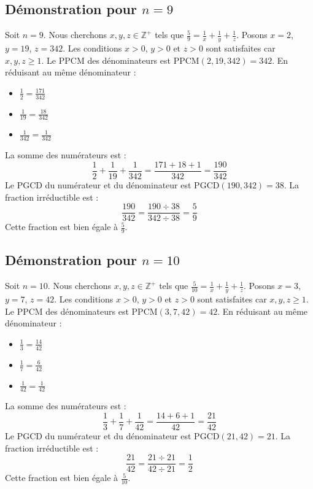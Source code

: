 \documentclass[11pt,a4paper]{article}
\begin{document}
\subsection{Démonstration pour $n = 9$}
Soit $n = 9$. Nous cherchons $x, y, z \in \mathbb{Z}^{+}$ tels que $\frac{5}{9} = \frac{1}{x} + \frac{1}{y} + \frac{1}{z}$.
Posons $x = 2$, $y = 19$, $z = 342$.
Les conditions $x > 0$, $y > 0$ et $z > 0$ sont satisfaites car $x, y, z \geq 1$.
Le PPCM des dénominateurs est $\text{PPCM}(2, 19, 342) = 342$.
En réduisant au même dénominateur :
\begin{itemize}
    \item $\frac{1}{2} = \frac{171}{342}$
    \item $\frac{1}{19} = \frac{18}{342}$
    \item $\frac{1}{342} = \frac{1}{342}$
\end{itemize}
La somme des numérateurs est :
$$ \frac{1}{2} + \frac{1}{19} + \frac{1}{342} = \frac{171 + 18 + 1}{342} = \frac{190}{342} $$
Le PGCD du numérateur et du dénominateur est $\text{PGCD}(190, 342) = 38$.
La fraction irréductible est :
$$ \frac{190}{342} = \frac{190 \div 38}{342 \div 38} = \frac{5}{9} $$
Cette fraction est bien égale à $\frac{5}{9}$.

\subsection{Démonstration pour $n = 10$}
Soit $n = 10$. Nous cherchons $x, y, z \in \mathbb{Z}^{+}$ tels que $\frac{5}{10} = \frac{1}{x} + \frac{1}{y} + \frac{1}{z}$.
Posons $x = 3$, $y = 7$, $z = 42$.
Les conditions $x > 0$, $y > 0$ et $z > 0$ sont satisfaites car $x, y, z \geq 1$.
Le PPCM des dénominateurs est $\text{PPCM}(3, 7, 42) = 42$.
En réduisant au même dénominateur :
\begin{itemize}
    \item $\frac{1}{3} = \frac{14}{42}$
    \item $\frac{1}{7} = \frac{6}{42}$
    \item $\frac{1}{42} = \frac{1}{42}$
\end{itemize}
La somme des numérateurs est :
$$ \frac{1}{3} + \frac{1}{7} + \frac{1}{42} = \frac{14 + 6 + 1}{42} = \frac{21}{42} $$
Le PGCD du numérateur et du dénominateur est $\text{PGCD}(21, 42) = 21$.
La fraction irréductible est :
$$ \frac{21}{42} = \frac{21 \div 21}{42 \div 21} = \frac{1}{2} $$
Cette fraction est bien égale à $\frac{5}{10}$.
\end{document}
